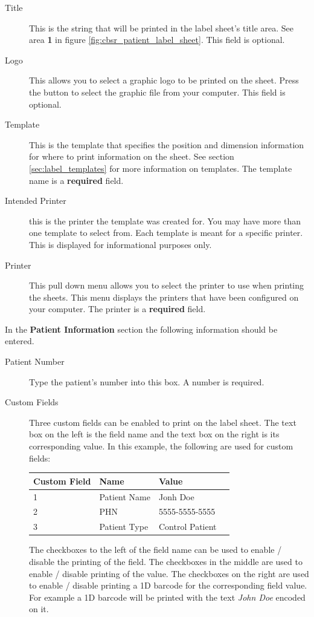 \begin{description}
\item[Title] This is the string that will be printed in the label sheet's title
  area. See area \textbf{1} in figure \ref{fig:cbsr_patient_label_sheet}. This field
  is optional.
\item[Logo] This allows you to select a graphic logo to be printed on the
  sheet. Press the  button to select the graphic file from your
  computer. This field is optional.
\item[Template] This is the template that specifies the position and dimension
  information for where to print information on the sheet. See section
  \ref{sec:label_templates} for more information on templates. The template
  name is a \textbf{required} field.
\item[Intended Printer] this is the printer the template was created for. You
  may have more than one template to select from. Each template is meant for a
  specific printer. This is displayed for informational purposes only.
\item[Printer] This pull down menu allows you to select the printer to use when
  printing the sheets. This menu displays the printers that have been
  configured on your computer. The printer is a \textbf{required} field.
\end{description}

In the \textbf{Patient Information} section the following information should be
entered.

\begin{description}
\item[Patient Number] Type the patient's number into this box. A number is required.
\item[Custom Fields] Three custom fields can be enabled to print on the
  label sheet. The text box on the left is the field name and the text box on
  the right is its corresponding value. In this example, the following are used
  for custom fields:

  \begin{center}
    \begin{tabular}{ | l | l | l | p{5cm} |}
      \hline
      Custom Field & Name & Value \\ \hline
      1 & Patient Name & Jonh Doe \\ \hline
      2 & PHN & 5555-5555-5555 \\ \hline
      3 & Patient Type & Control Patient \\
      \hline
    \end{tabular}
  \end{center}

  The checkboxes to the left of the field name can be used to enable / disable
  the printing of the field. The checkboxes in the middle are used to enable /
  disable printing of the value. The checkboxes on the right are used to enable
  / disable printing a 1D barcode for the corresponding field value. For
  example a 1D barcode will be printed with the text \emph{John Doe} encoded on
  it.
\end{description}

